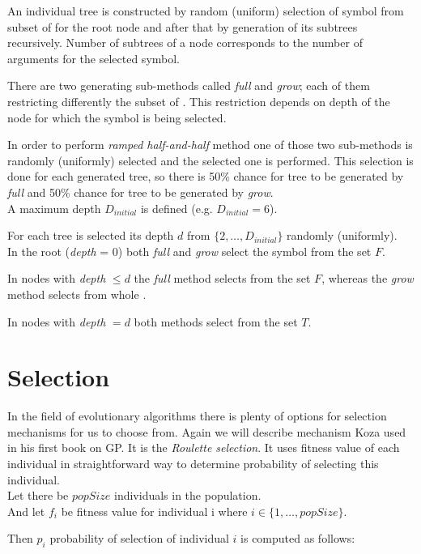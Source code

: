 \documentclass[12pt,a4paper]{report}
\newcommand{\setDots}[2]{ 
	\lbrace #1 , \dots , #2 \rbrace
}
\begin{document}
An individual tree is constructed by random (uniform) selection of symbol from 
subset of \TuF for the root node and after that by generation of its 
subtrees recursively. 
Number of subtrees of a node corresponds 
to the number of arguments for the selected symbol. 

There are two generating sub-methods called \textit{full} and 
\textit{grow}; each of them restricting differently the subset of \TuF. 
This restriction depends on depth of the
node for which the symbol is being selected. 

In order to perform \textit{ramped half-and-half} method
one of those two sub-methods is randomly (uniformly) 
selected and the selected one is performed.
This selection is done for each generated tree, so there
is 50\% chance for tree to be generated by \textit{full} 
and 50\% chance for tree to be generated by \textit{grow}.\\


A maximum depth $D_{initial}$ is defined (e.g. $D_{initial} = 6$).

For each tree is selected its 
depth $d$ from $\setDots{2}{D_{initial}}$ randomly (uniformly).\\


In the root (\textit{depth} = 0) both \textit{full} and \textit{grow}
select the symbol from the set $F$.

In nodes with \textit{depth} $\leq d$ the \textit{full}
method selects from the set $F$, whereas the \textit{grow} method 
selects from whole \TuF.

In nodes with \textit{depth} $= d$ both methods select from the
set $T$.

\section{Selection}

In the field of evolutionary algorithms there is plenty of 
options for selection mechanisms 
for us to choose from. Again we will describe mechanism Koza
used in his first book on GP. It is the \textit{Roulette selection}.
It uses fitness value of each individual in straightforward way to determine probability of selecting this individual.\\

Let there be $popSize$ individuals in the population.\\
And let $f_{i}$ be fitness value for individual i 
where $i \in \setDots{1}{popSize}$. 

Then $p_{i}$ probability of selection of individual $i$ is computed
as follows:
\end{document}
